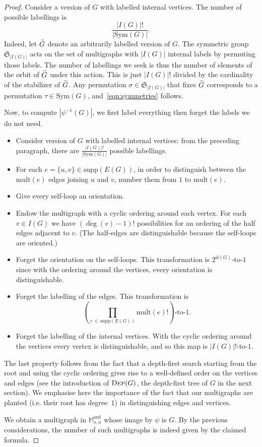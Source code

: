 \documentclass[10pt]{amsart}
\theoremstyle{definition}\newtheorem{defi}[theo]{Definition}\newtheorem{rema}[theo]{Remark}\newtheorem{exam}[theo]{Example}\newtheorem{exem}[theo]{Example}\newtheorem{nota}[theo]{Notation}
\newcommand{\abs}[1]{\left\lvert#1\right\rvert}
\newcommand{\supp}{\mathrm{supp}}
\newcommand{\ord}{\mathrm{ord}}
\newcommand{\sll}{\mathrm{sl}}
\newcommand{\Sym}{\mathrm{Sym}}
\newcommand{\mult}{\mathrm{mult}}
\newcommand{\M}{\mathbb{M}}
\newcommand{\frkS}{\mathfrak{S}}
\let\oldtilde\tilde
\renewcommand*{\tilde}[1]{\mathchoice{\widetilde{#1}}{\widetilde{#1}}{\oldtilde{#1}}{\oldtilde{#1}}}
\begin{document}
\begin{proof}
Consider a version of $G$ with labelled internal vertices. The number of possible labellings is
\begin{equation}\label{eqn:symmetries}
\frac{\abs{I(G)}!}{\abs{\Sym(G)}}.
\end{equation}
Indeed, let $\tilde{G}$ denote an arbitrarily labelled version of $G$. The symmetric group $\frkS_{\abs{I(G)}}$ acts on the set of multigraphs with $\abs{I(G)}$ internal labels by permuting those labels. The number of labellings we seek is thus the number of elements of the orbit of $\tilde{G}$ under this action. This is just $\abs{I(G)}!$ divided by the cardinality of the stabilizer of $\tilde{G}$. Any permutation $\sigma\in \frkS_{\abs{I(G)}}$ that fixes $\tilde{G}$ corresponds to a permutation $\tau\in\Sym(G)$, and~\eqref{eqn:symmetries} follows.

Now, to compute $\left|\psi^{-1}(G) \right|$, we first label everything then forget the labels we do not need.
\begin{itemize}
\item Consider version of $G$ with labelled internal vertices: from the preceding paragraph, there are $\frac{|I(G)|!}{|\Sym(G)|}$ possible labellings.
\item For each $e=\{u,v\}\in \supp(E(G))$, in order to distinguish between the $\mult(e)$ edges joining $u$ and $v$, number them from $1$ to $\mult(e)$.
\item Give every self-loop an orientation.
\item Endow the multigraph with a cyclic ordering around each vertex. For each $v\in I(G)$ we have $(\deg(v) -1)!$ possibilities for an ordering of the half edges adjacent to $v$. (The half-edges are distinguishable because the self-loops are oriented.)
\item Forget the orientation on the self-loops. This transformation is $2^{\sll(G)}$-to-$1$ since with the ordering around the vertices, every orientation is distinguishable.
\item Forget the labelling of the edges. This transformation is
\[
\left(\prod_{e\,\in\,\supp(E(G))} \mult(e)!\right)\text{-to-}1.
\]
\item Forget the labelling of the internal vertices. With the cyclic ordering around the vertices every vertex is distinguishable, and so this map is $\abs{I(G)}!$-to-$1$.
\end{itemize}
The last property follows from the fact that a depth-first search starting from the root and using the cyclic ordering gives rise to a well-defined order on the vertices and edges (see the introduction of $\textsc{Dep}(G)$, the depth-first tree of $G$ in the next section). We emphasise here the importance of the fact that our multigraphs are planted (i.e. their root has degree~$1$) in distinguishing edges and vertices.

We obtain a multigraph in $\M_{s,n}^{\ord}$ whose image by $\psi$ is $G$. By the previous considerations, the number of such multigraphs is indeed given by the claimed formula.
\end{proof}
\end{document}
